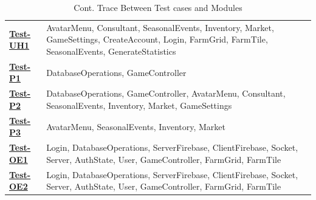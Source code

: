\documentclass[12pt, titlepage]{article}
\begin{document}
\begin{table}[H]
\begin{tabular}{p{} p{}}
\hyperref[Test-UH1]{\textbf{Test-UH1}} & AvatarMenu, Consultant, SeasonalEvents, Inventory, Market, GameSettings, CreateAccount, Login, FarmGrid, FarmTile, SeasonalEvents, GenerateStatistics\\
\hyperref[Test-P1]{\textbf{Test-P1}} & DatabaseOperations, GameController\\
\hyperref[Test-P2]{\textbf{Test-P2}} & DatabaseOperations, GameController, AvatarMenu, Consultant, SeasonalEvents, Inventory, Market, GameSettings\\
\hyperref[Test-P3]{\textbf{Test-P3}} &   AvatarMenu, SeasonalEvents, Inventory, Market\\
\hyperref[Test-OE1]{\textbf{Test-OE1}} &   Login, DatabaseOperations, ServerFirebase, ClientFirebase, Socket, Server, AuthState, User, GameController, FarmGrid, FarmTile\\
\hyperref[Test-OE2]{\textbf{Test-OE2}} &   Login, DatabaseOperations, ServerFirebase, ClientFirebase, Socket, Server, AuthState, User, GameController, FarmGrid, FarmTile\\
\bottomrule
\end{tabular}
\caption{Cont. Trace Between Test cases and Modules}
\label{TblACT}
\end{table}
\end{document}
